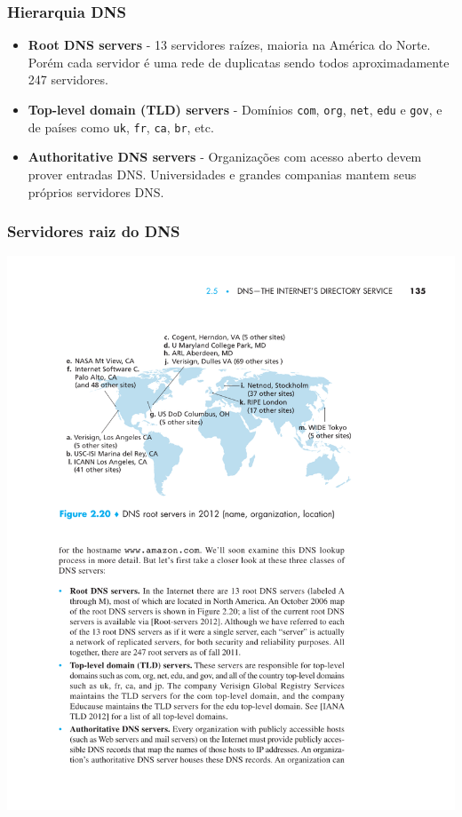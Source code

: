 \documentclass[xcolor=dvipsnames,10pt,compress,aspectratio=169]{beamer}
\begin{document}
\begin{frame}[fragile]
  \frametitle{Hierarquia DNS}
  \begin{itemize}
  \item {\bf Root DNS servers} - 13 servidores raízes, maioria na América do Norte. Porém cada servidor
    é uma rede de duplicatas sendo todos aproximadamente 247 servidores.
  \item {\bf Top-level domain (TLD) servers} - Domínios \verb+com+, \verb+org+, \verb+net+,
    \verb+edu+ e \verb+gov+, e de países como \verb+uk+, \verb+fr+, \verb+ca+, \verb+br+, etc.
  \item {\bf Authoritative DNS servers} - Organizações com acesso aberto devem prover entradas
    DNS. Universidades e grandes companias mantem seus próprios servidores DNS.
  \end{itemize}
\end{frame}

\begin{frame}
  \frametitle{Servidores raiz do DNS}
  \begin{center}
  \includegraphics[scale=0.9]{kurose-02-20}
  \end{center}
\end{frame}
\end{document}
